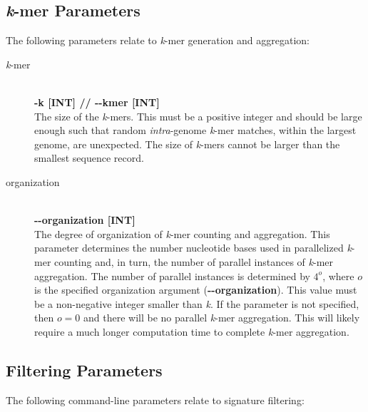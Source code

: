 \documentclass[a4paper,10pt]{article}
\begin{document}
\subsection{\textit{k}-mer Parameters}

The following parameters relate to \textit{k}-mer generation and aggregation:

\begin{description}

  \item[\textit{k}-mer] \hfill \\
  \textbf{-k [INT] // -{}-kmer [INT]} \hfill \\
  The size of the \textit{k}-mers. This must be a positive integer and should be large enough such that random \textit{intra}-genome \textit{k}-mer matches, within the largest genome, are unexpected. The size of \textit{k}-mers cannot be larger than the smallest sequence record.
  
  \item[organization] \hfill \\
  \textbf{-{}-organization [INT]} \hfill \\
  The degree of organization of \textit{k}-mer counting and aggregation. This parameter determines the number nucleotide bases used in parallelized \textit{k}-mer counting and, in turn, the number of parallel instances of \textit{k}-mer aggregation. The number of parallel instances is determined by \(4^{o}\), where \(o\) is the specified organization argument (\textbf{\mbox{-{}-organization}}). This value must be a non-negative integer smaller than \textit{k}. If the parameter is not specified, then \(o = 0\) and there will be no parallel \textit{k}-mer aggregation. This will likely require a much longer computation time to complete \textit{k}-mer aggregation.
  
\end{description}

\subsection{Filtering Parameters}

The following command-line parameters relate to signature filtering:
\end{document}
